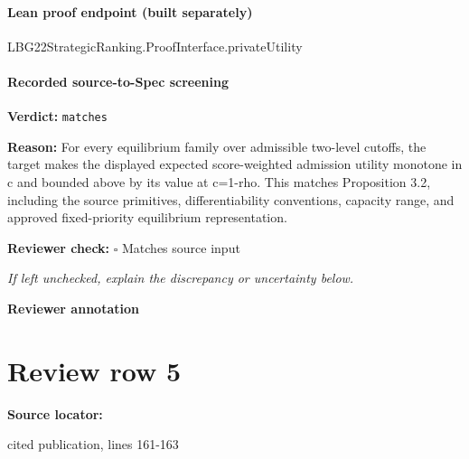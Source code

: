 \documentclass[10pt]{article}
\newcommand{\reviewerbox}{%
  \par\noindent\fbox{\parbox{0.96\linewidth}{\rule{0pt}{0.38in}}}\par
}
\newcommand{\reviewmatch}[1]{%
  \par\noindent\textbf{Reviewer check:} $\square$\; #1\par
  \noindent\emph{If left unchecked, explain the discrepancy or uncertainty below.}\par
}
\begin{document}
\paragraph{Lean proof endpoint (built separately)}\begin{ReviewVerbatim}
LBG22StrategicRanking.ProofInterface.privateUtility
\end{ReviewVerbatim}

\paragraph{Recorded source-to-Spec screening}
\textbf{Verdict:} \texttt{matches}
\\
{\raggedright
\textbf{Reason:} For every equilibrium family over admissible two-\allowbreak{}level cutoffs, the target makes the displayed expected score-\allowbreak{}weighted admission utility monotone in c and bounded above by its value at c=1-\allowbreak{}rho.\allowbreak{} This matches Proposition 3.\allowbreak{}2, including the source primitives, differentiability conventions, capacity range, and approved fixed-\allowbreak{}priority equilibrium representation.\allowbreak{}
\par}
\reviewmatch{Matches source input}
\noindent\textbf{Reviewer annotation}\par
\reviewerbox
\clearpage
\hypertarget{source-claim-5cd4797b5f4721de}{}
\section*{Review row 5}
\textbf{Source locator:} {\footnotesize\raggedright cited publication, lines 161-\allowbreak{}163\par}
\end{document}
